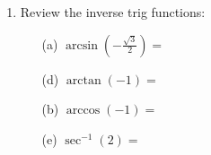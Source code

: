 \documentclass[letterpaper,11pt]{article}
\newif\ifsolutions
\begin{document}
\begin{enumerate}
\begin{changemargin}{0cm}{0cm}
\begin{multicols}{3}
\begin{enumerate}
\item[(d)] $\displaystyle \sin{\left(-\frac{\pi}{6} \right)}=$ 
\ifsolutions \textcolor{blue}{$\displaystyle-\frac{1}{2}$} \fi
\vspace{.25in}

\item[(b)] $\displaystyle \cos{\left( \frac{5\pi}{4} \right)}=$ 
\ifsolutions \textcolor{blue}{$\displaystyle -\frac{\sqrt{2}}{2}$} \fi
\vspace{.25in}

\item[(e)] $\displaystyle \sec{\left( \frac{5\pi}{3} \right)}=$ 
\ifsolutions \textcolor{blue}{$2$} \fi
\vspace{.25in}

\item[(c)] $\displaystyle \tan{\left(\frac{7\pi}{6} \right)}=$
\ifsolutions \textcolor{blue}{$\displaystyle \frac{\sqrt{3}}{3}$} \fi
\vspace{.25in}

\item[(f)] $\displaystyle \tan{\left(-\frac{3\pi}{2}\right)}=$
\ifsolutions \textcolor{blue}{undefined} \fi
\vspace{.25in}

\end{enumerate}
\end{multicols}
\end{changemargin}

\item  Review the inverse trig functions:
\begin{changemargin}{0cm}{0cm}
\begin{multicols}{3}
\begin{enumerate}

\item[(a)] $\displaystyle \arcsin{\left(-\frac{\sqrt{3}}{2}\right)}=$ 
\ifsolutions \textcolor{blue}{$-\frac{\pi}{3}$} \fi
\vspace{.25in}

\item[(d)] $\displaystyle \arctan{(-1)}=$ 
\ifsolutions \textcolor{blue}{$-\frac{\pi}{4}$} \fi
\vspace{.25in}

\item[(b)] $\displaystyle \arccos{(-1)}=$ 
\ifsolutions \textcolor{blue}{$\pi$} \fi
\vspace{.25in}

\item[(e)] $\displaystyle \sec^{-1}{(2)}=$ 
\ifsolutions \textcolor{blue}{$\frac{\pi}{3}$} \fi
\vspace{.25in}


\end{enumerate}
\end{multicols}
\end{changemargin}
\end{enumerate}
\end{document}
